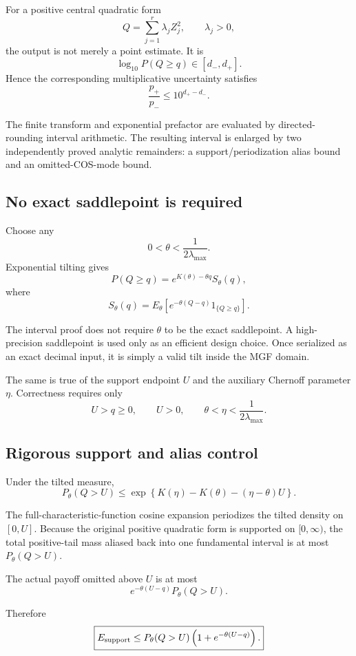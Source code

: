 \documentclass[11pt]{article}
\theoremstyle{definition}
\theoremstyle{remark}
\begin{document}
For a positive central quadratic form
\[
Q=\sum_{j=1}^{r}\lambda_jZ_j^2,
\qquad
\lambda_j>0,
\]
the output is not merely a point estimate.  It is
\[
\boxed{
\log_{10}P(Q\ge q)\in[d_-,d_+].
}
\]
Hence the corresponding multiplicative uncertainty satisfies
\[
\boxed{
\frac{p_+}{p_-}\le 10^{d_+-d_-}.
}
\]

The finite transform and exponential prefactor are evaluated by
directed-rounding interval arithmetic.  The resulting interval is enlarged by
two independently proved analytic remainders: a support/periodization alias
bound and an omitted-COS-mode bound.

\subsection{No exact saddlepoint is required}

Choose any
\[
0<\theta<\frac{1}{2\lambda_{\max}}.
\]
Exponential tilting gives
\[
P(Q\ge q)
=
e^{K(\theta)-\theta q}
S_\theta(q),
\]
where
\[
S_\theta(q)
=
E_\theta\!\left[
e^{-\theta(Q-q)}
1_{\{Q\ge q\}}
\right].
\]

The interval proof does not require \(\theta\) to be the exact saddlepoint.
A high-precision saddlepoint is used only as an efficient design choice.
Once serialized as an exact decimal input, it is simply a valid tilt inside
the MGF domain.

The same is true of the support endpoint \(U\) and the auxiliary Chernoff
parameter \(\eta\).  Correctness requires only
\[
U>q\ge0,\qquad U>0,
\qquad
\theta<\eta<\frac{1}{2\lambda_{\max}}.
\]

\subsection{Rigorous support and alias control}

Under the tilted measure,
\[
P_\theta(Q>U)
\le
\exp\left\{
K(\eta)-K(\theta)-(\eta-\theta)U
\right\}.
\]

The full-characteristic-function cosine expansion periodizes the tilted density
on \([0,U]\).  Because the original positive quadratic form is supported on
\([0,\infty)\), the total positive-tail mass aliased back into one fundamental
interval is at most \(P_\theta(Q>U)\).

The actual payoff omitted above \(U\) is at most
\[
e^{-\theta(U-q)}P_\theta(Q>U).
\]

Therefore
\[
\boxed{
E_{\rm support}
\le
P_\theta(Q>U)
\left(
1+e^{-\theta(U-q)}
\right).
}
\]
\end{document}
